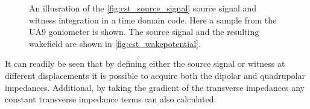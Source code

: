 \begin{figure}
\begin{center}

\end{center}
\caption{An illusration of the \ref{fig:cst_source_signal} source signal and witness integration in a time domain code. Here a sample from the UA9 goniometer is shown. The source signal and the resulting wakefield are shown in \ref{fig:cst_wakepotential}.}
\label{fig:time_domain_beam}
\end{figure}

It can readily be seen that by defining either the source signal or witness at different displacements it is possible to acquire both the dipolar and quadrupolar impedances. Additional, by taking the gradient of the transverse impedances any constant transverse impedance terms can also calculated.
